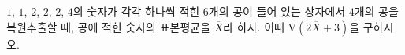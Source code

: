 $1$, $1$, $2$, $2$, $2$, $4$의 숫자가 각각 하나씩 적힌 $6$개의 공이 들어 있는 상자에서 $4$개의 공을 복원추출할 때, 공에 적힌 숫자의 표본평균을 $\overline{X}$라 하자. 이때 $\mathrm{V}(2\overline{X}+3)$을 구하시오.
